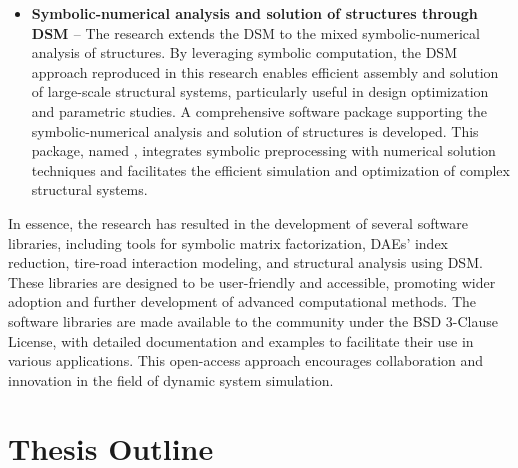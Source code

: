 \begin{itemize}
  \item \textbf{Symbolic-numerical analysis and solution of structures through \ac{DSM} \cite{trussme, stocco2024trussme, larcher2024imece_symbolic}} -- The research extends the \ac{DSM} to the mixed symbolic-numerical analysis of structures. By leveraging symbolic computation, the \ac{DSM} approach reproduced in this research enables efficient assembly and solution of large-scale structural systems, particularly useful in design optimization and parametric studies. A comprehensive software package supporting the symbolic-numerical analysis and solution of structures is developed. This package, named \TrussMe{}, integrates symbolic preprocessing with numerical solution techniques and facilitates the efficient simulation and optimization of complex structural systems.
\end{itemize}
%
In essence, the research has resulted in the development of several software libraries, including tools for symbolic matrix factorization, \acp{DAE}' index reduction, tire-road interaction modeling, and structural analysis using \ac{DSM}. These libraries are designed to be user-friendly and accessible, promoting wider adoption and further development of advanced computational methods. The software libraries are made available to the community under the \ac{BSD} 3-Clause License, with detailed documentation and examples to facilitate their use in various applications. This open-access approach encourages collaboration and innovation in the field of dynamic system simulation.


\section{Thesis Outline}

